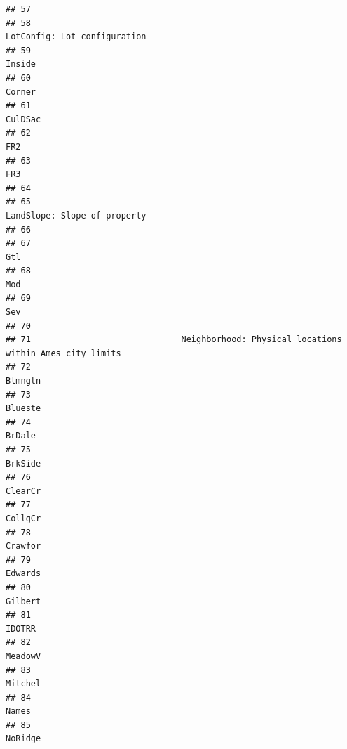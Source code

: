 \documentclass[
]{article}
\begin{document}
\begin{verbatim}
## 57                                                                                      
## 58                                                          LotConfig: Lot configuration
## 59                                                                                Inside
## 60                                                                                Corner
## 61                                                                               CulDSac
## 62                                                                                   FR2
## 63                                                                                   FR3
## 64                                                                                      
## 65                                                          LandSlope: Slope of property
## 66                                                                                      
## 67                                                                                   Gtl
## 68                                                                                   Mod
## 69                                                                                   Sev
## 70                                                                                      
## 71                              Neighborhood: Physical locations within Ames city limits
## 72                                                                               Blmngtn
## 73                                                                               Blueste
## 74                                                                                BrDale
## 75                                                                               BrkSide
## 76                                                                               ClearCr
## 77                                                                               CollgCr
## 78                                                                               Crawfor
## 79                                                                               Edwards
## 80                                                                               Gilbert
## 81                                                                                IDOTRR
## 82                                                                               MeadowV
## 83                                                                               Mitchel
## 84                                                                                 Names
## 85                                                                               NoRidge

\end{verbatim}
\end{document}
